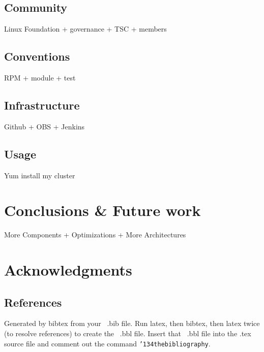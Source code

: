 \documentclass{sig-alternate-05-2015}
\begin{document}
\subsection{Community}
Linux Foundation + governance + TSC + members

\subsection{Conventions}
RPM + module + test

\subsection{Infrastructure}
Github + OBS + Jenkins

\subsection{Usage}
Yum install my cluster

\section{Conclusions \& Future work}
More Components + Optimizations + More Architectures

\section{Acknowledgments}

%

%
%
\subsection{References}
Generated by bibtex from your ~.bib file.  Run latex,
then bibtex, then latex twice (to resolve references)
to create the ~.bbl file.  Insert that ~.bbl file into
the .tex source file and comment out
the command \texttt{{\char'134}thebibliography}.
\end{document}
